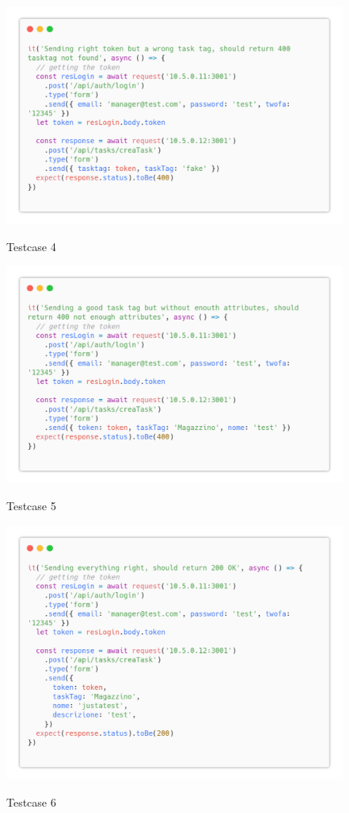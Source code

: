 \documentclass{report}
\begin{document}
\begin{figure}[H]
	\centering\includegraphics[width=1\textwidth]{images/code_crea_task_test4.png}
	
	Testcase 4
\end{figure}
\begin{figure}[H]
	\centering\includegraphics[width=1\textwidth]{images/code_crea_task_test5.png}
	
	Testcase 5
\end{figure}
\begin{figure}[H]
	\centering\includegraphics[width=1\textwidth]{images/code_crea_task_test6.png}
	
	Testcase 6
\end{figure}
\end{document}
